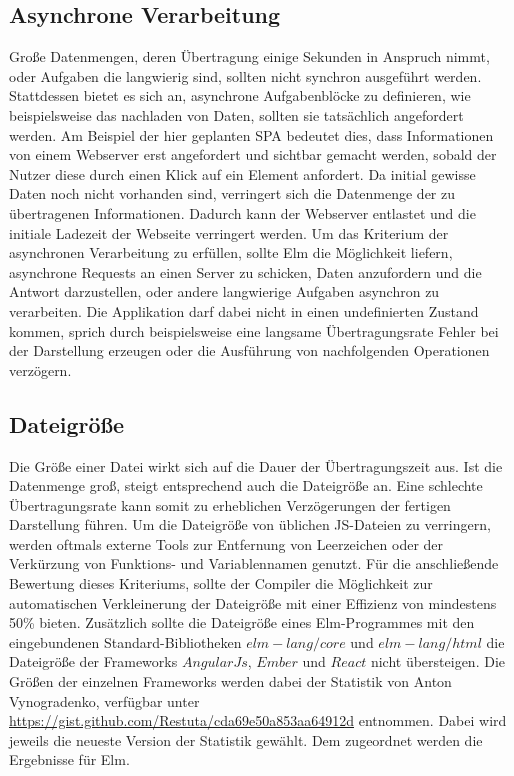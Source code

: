 \subsection{Asynchrone Verarbeitung}
\label{sec:muster_asynchrone_verarbeitung}
Große Datenmengen, deren Übertragung einige Sekunden in Anspruch nimmt, oder Aufgaben die langwierig sind, sollten nicht synchron ausgeführt werden. Stattdessen bietet es sich an, asynchrone Aufgabenblöcke zu definieren, wie beispielsweise das nachladen von Daten, sollten sie tatsächlich angefordert werden. Am Beispiel der hier geplanten \ac{SPA} bedeutet dies, dass Informationen von einem Webserver erst angefordert und sichtbar gemacht werden, sobald der Nutzer diese durch einen Klick auf ein Element anfordert. Da initial gewisse Daten noch nicht vorhanden sind, verringert sich die Datenmenge der zu übertragenen Informationen. Dadurch kann der Webserver entlastet und die initiale Ladezeit der Webseite verringert werden. Um das Kriterium der asynchronen Verarbeitung zu erfüllen, sollte Elm die Möglichkeit liefern, asynchrone Requests an einen Server zu schicken, Daten anzufordern und die Antwort darzustellen, oder andere langwierige Aufgaben asynchron zu verarbeiten. Die Applikation darf dabei nicht in einen undefinierten Zustand kommen, sprich durch beispielsweise eine langsame Übertragungsrate Fehler bei der Darstellung erzeugen oder die Ausführung von nachfolgenden Operationen verzögern.


\subsection{Dateigröße}
\label{sec:muster_dateigroesse}
Die Größe einer Datei wirkt sich auf die Dauer der Übertragungszeit aus. Ist die Datenmenge groß, steigt entsprechend auch die Dateigröße an. Eine schlechte Übertragungsrate kann somit zu erheblichen Verzögerungen der fertigen Darstellung führen. Um die Dateigröße von üblichen \ac{JS}-Dateien zu verringern, werden oftmals externe Tools zur Entfernung von Leerzeichen oder der Verkürzung von Funktions- und Variablennamen genutzt. Für die anschließende Bewertung dieses Kriteriums, sollte der Compiler die Möglichkeit zur automatischen Verkleinerung der Dateigröße mit einer Effizienz von mindestens 50\% bieten. Zusätzlich sollte die Dateigröße eines Elm-Programmes mit den eingebundenen Standard-Bibliotheken $elm-lang/core$ und $elm-lang/html$ die Dateigröße der Frameworks $AngularJs$, $Ember$ und $React$ nicht übersteigen. Die Größen der einzelnen Frameworks werden dabei der Statistik von Anton Vynogradenko, verfügbar unter \url{https://gist.github.com/Restuta/cda69e50a853aa64912d} entnommen. Dabei wird jeweils die neueste Version der Statistik gewählt. Dem zugeordnet werden die Ergebnisse für Elm.

